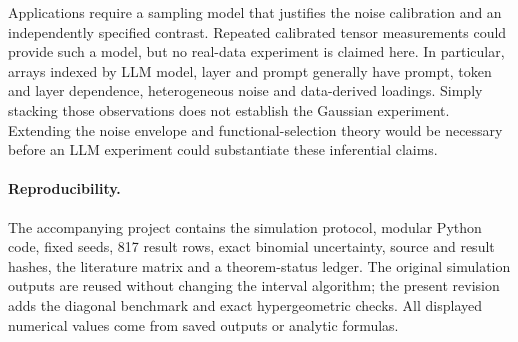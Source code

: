 \documentclass[11pt]{article}
\theoremstyle{remark}
\begin{document}
Applications require a sampling model that justifies the noise calibration and an independently specified contrast. Repeated calibrated tensor measurements could provide such a model, but no real-data experiment is claimed here. In particular, arrays indexed by LLM model, layer and prompt generally have prompt, token and layer dependence, heterogeneous noise and data-derived loadings. Simply stacking those observations does not establish the Gaussian experiment. Extending the noise envelope and functional-selection theory would be necessary before an LLM experiment could substantiate these inferential claims.

\paragraph{Reproducibility.}
The accompanying project contains the simulation protocol, modular Python code, fixed seeds, 817 result rows, exact binomial uncertainty, source and result hashes, the literature matrix and a theorem-status ledger. The original simulation outputs are reused without changing the interval algorithm; the present revision adds the diagonal benchmark and exact hypergeometric checks. All displayed numerical values come from saved outputs or analytic formulas.

\appendix



\end{document}
